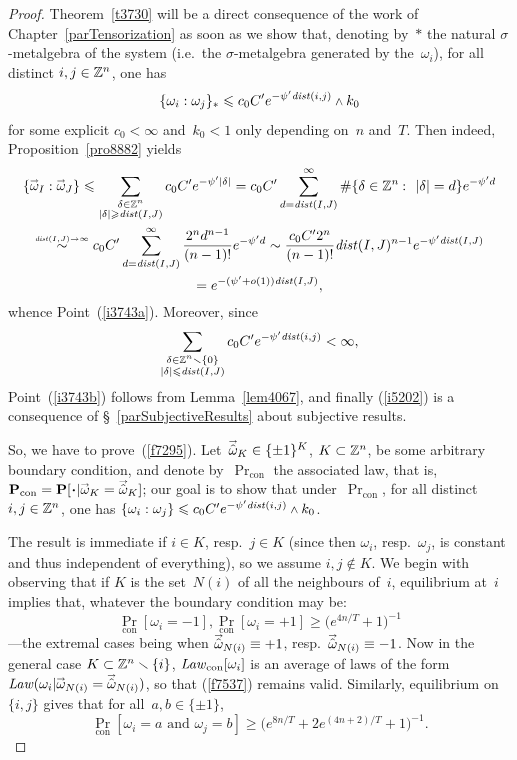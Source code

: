 \begingroup{}\begin{proof}
Theorem~\ref{t3730} will be a direct consequence of the work of Chapter~\ref{parTensorization}
as soon as we show that, denoting by~$*$ the natural $\sigma$-metalgebra of the system
(i.e.\ the $\sigma$-metalgebra generated by the~$\omega_i$), for all distinct $i,j\in\mathbb{Z}^n$,
one has
\[\label{f7295} \{ \omega_i : \omega_j \}_* \leq c_0C' e^{-\psi' \dist(i,j)} \wedge k_0 \]
for some explicit $c_0 < \infty$ and~$k_0 < 1$ only depending on~$n$ and~$T$.
Then indeed, Proposition~\ref{pro8882} yields
%
\begin{multline}
\{ \vec\omega_I : \vec\omega_J \} \leq
\sum_{\substack{\delta\in\ZZ^n\\|\delta|\geq\dist(I,J)}}
c_0C' e^{-\psi'|\delta|}
= c_0C' \sum_{d=\dist(I,J)}^\infty
\#\{\delta\in\ZZ^n\colon |\delta|=d\} e^{-\psi'd} \\
\stackrel{\mathsmaller{\dist(I,J)\longto\infty}}{\sim}
c_0C' \sum_{d=\dist(I,J)}^\infty \frac{2^nd^{n-1}}{(n-1)!} e^{-\psi'd}
\sim \frac{c_0C'2^n}{(n-1)!} \dist(I,J)^{n-1} e^{-\psi'\dist(I,J)} \\
= e^{-(\psi'+o(1))\dist(I,J)},
\end{multline}
whence Point~(\ref{i3743a}). Moreover, since
\[ \sum_{\substack{\delta\in\mathbb{Z}^n\smallsetminus\{0\}
\\|\delta|\leqslant\mathit{dist}(I,J)}} c_0C' e^{-\psi' \mathit{dist}(i,j)}
< \infty ,\]
Point~(\ref{i3743b}) follows from Lemma~\ref{lem4067},
and finally (\ref{i5202}) is a consequence of \S~\ref{parSubjectiveResults}
about subjective results.

So, we have to prove~(\ref{f7295}).
Let~$\vechat{\omega}_K \in \{\pm1\}^K$, $K\subset\mathbb{Z}^n$, be some arbitrary boundary condition,
and denote by~$\Pr_{\mathrm{con}}$ the associated law,
that is, $\Pr_{\mathrm{con}} = \Pr[\Bcdot|{\vec\omega_K = \vechat{\omega}_K}]$;
our goal is to show that under~$\Pr_{\mathrm{con}}$, for all distinct $i,j\in\mathbb{Z}^n$, one has
$\{ \omega_i : \omega_j \} \leq c_0C' e^{-\psi' \dist(i,j)} \wedge k_0$.

The result is immediate if $i\in K$, resp.\ $j\in K$
(since then $\omega_i$, resp.~$\omega_j$, is constant and thus independent of everything),
so we assume $i,j\notin K$.
%
We begin with observing that if $K$ is the set~$N(i)$ of all the neighbours of~$i$,
equilibrium at~$i$ implies that, whatever the boundary condition may be:
\[\label{f7537} \Pr_{\mathrm{con}}[\omega_i = -1], \Pr_{\mathrm{con}}[\omega_i = +1]
\geq \big( e^{4n/T} + 1 \big)^{-1} \]
—the extremal cases being when $\vechat{\omega}_{N(i)} \equiv +1$,
resp.\ $\vechat{\omega}_{N(i)} \equiv -1$.
Now in the general case $K \subset \mathbb{Z}^n\smallsetminus\{i\}$,
$\operatorname{\mathit{Law}}_{\mathrm{con}}[\omega_i]$ is an average of laws of the form
$\Law(\omega_i|{\vec\omega_{N(i)}=\vechat{\omega}_{N(i)}})$,
so that (\ref{f7537}) remains valid.
%
Similarly, equilibrium on~$\{i,j\}$ gives that
for all~$a,b\in\{\pm1\}$,
\[ \label{f7538} \Pr_{\mathrm{con}}[\omega_i = a \text{ and } \omega_j = b]
\geq \big( e^{8n/T} + 2e^{(4n+2)/T} + 1 \big)^{-1} .\]


\end{proof}
